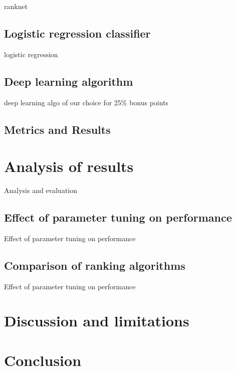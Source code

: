 \documentclass[english]{article}
\theoremstyle{definition}
\begin{document}
ranknet

\subsection{Logistic regression classifier}

logistic regression

\subsection{Deep learning algorithm}

deep learning algo of our choice for 25\% bonus points \cite{gradclip}

\subsection{Metrics and Results}

\section{Analysis of results}

Analysis and evaluation

\subsection{Effect of parameter tuning on performance}

Effect of parameter tuning on performance

\subsection{Comparison of ranking algorithms}

Effect of parameter tuning on performance

\section{Discussion and limitations}

\section{Conclusion}

\newpage
\medskip



\end{document}
